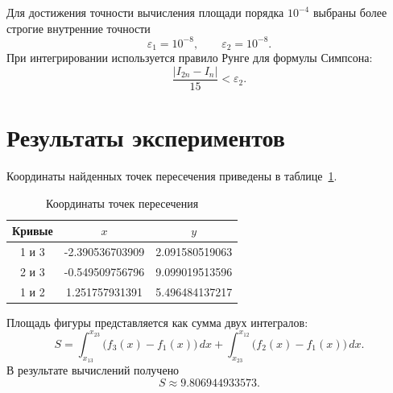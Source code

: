\documentclass[a4paper,12pt,titlepage,finall]{article}
\begin{document}
Для достижения точности вычисления площади порядка $10^{-4}$ выбраны
более строгие внутренние точности
\[
    \varepsilon_1=10^{-8},\qquad \varepsilon_2=10^{-8}.
\]
При интегрировании используется правило Рунге для формулы Симпсона:
\[
    \frac{|I_{2n}-I_n|}{15}<\varepsilon_2.
\]

\newpage

\section{Результаты экспериментов}

Координаты найденных точек пересечения приведены в таблице~\ref{table1}.

\begin{table}[h]
\centering
\begin{tabular}{|c|c|c|}
\hline
Кривые & $x$ & $y$ \\
\hline
1 и 3 & -2.390536703909 & 2.091580519063 \\
2 и 3 & -0.549509756796 & 9.099019513596 \\
1 и 2 &  1.251757931391 & 5.496484137217 \\
\hline
\end{tabular}
\caption{Координаты точек пересечения}
\label{table1}
\end{table}

Площадь фигуры представляется как сумма двух интегралов:
\[
S =
\int_{x_{13}}^{x_{23}}\bigl(f_3(x)-f_1(x)\bigr)\,dx+
\int_{x_{23}}^{x_{12}}\bigl(f_2(x)-f_1(x)\bigr)\,dx.
\]
В результате вычислений получено
\[
    S\approx 9.806944933573.
\]
\end{document}
